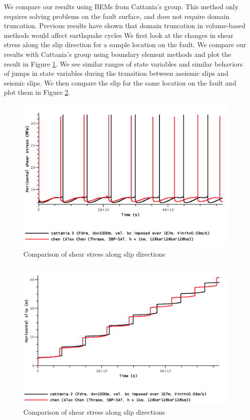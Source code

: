 We compare our results using BEMs from Cattania's group. This method only requires solving problems on the fault surface, and does not require domain truncation. Previous results have shown that domain truncation in volume-based methods would affect earthquake cycles
We first look at the changes in shear stress along the slip direction for a sample location on the fault. We compare our results with Cattania's group using boundary element methods and plot the result in Figure \ref{fig:bp5-shearstress}. We see similar ranges of state variables and similar behaviors of jumps in state variables during the transition between aseismic slips and seismic slips. We then compare the slip for the same location on the fault and plot them in Figure \ref{fig:bp5-slip2}.

\begin{figure}
    \centering
    \includegraphics[width=\linewidth]{figures/sample-shearstress.png}
    \caption{Comparison of shear stress along slip directions}
    \label{fig:bp5-shearstress}
\end{figure}

\begin{figure}
    \centering
    \includegraphics[width=\linewidth]{figures/sample-slip-2.png}
    \caption{Comparison of shear stress along slip directions}
    \label{fig:bp5-slip2}
\end{figure}

